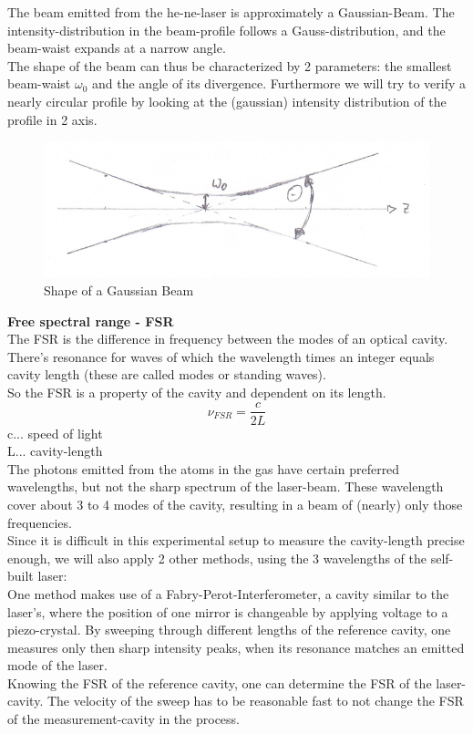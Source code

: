 \documentclass[12pt,a4paper]{article}
\begin{document}
\begin{multicols}{2}
The beam emitted from the he-ne-laser is approximately a Gaussian-Beam. The intensity-distribution in the beam-profile follows a Gauss-distribution, and the beam-waist expands at a narrow angle.\\
The shape of the beam can thus be characterized by 2 parameters: the smallest beam-waist $\omega_0$ and the angle of its divergence. Furthermore we will try to verify a nearly circular profile by looking at the (gaussian) intensity distribution of the profile in 2 axis.\\

\begin{figure}[H]
 \centering
 \includegraphics[scale=0.70]{./figures/gaussian_beam.png}
 \caption{Shape of a Gaussian Beam}
 \label{fig:gauss_beam}
\end{figure}

\noindent \textbf{Free spectral range - FSR}\\
The FSR is the difference in frequency between the modes of an optical cavity. There's resonance for waves of which the wavelength times an integer equals cavity length (these are called modes or standing waves).\\
So the FSR is a property of the cavity and dependent on its length.
$$\nu_{FSR} = \frac{c}{2L}$$
c... speed of light \\
L... cavity-length\\


\noindent The photons emitted from the atoms in the gas have certain preferred wavelengths, but not the sharp spectrum of the laser-beam. These wavelength cover about 3 to 4 modes of the cavity, resulting in a beam of (nearly) only those frequencies.\\
Since it is difficult in this experimental setup to measure the cavity-length precise enough, we will also apply 2 other methods, using the 3 wavelengths of the self-built laser:\\

\noindent One method makes use of a Fabry-Perot-Interferometer, a cavity similar to the laser's, where the position of one mirror is changeable by applying voltage to a piezo-crystal. By sweeping through different lengths of the reference cavity, one measures only then sharp intensity peaks, when its resonance matches an emitted mode of the laser.\\
Knowing the FSR of the reference cavity, one can determine the FSR of the laser-cavity. The velocity of the sweep has to be reasonable fast to not change the FSR of the measurement-cavity in the process.\\


\end{multicols}
\end{document}
